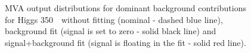 \begin{figure}[!hbtp]
\caption{
MVA output distributions for dominant background contributions for
Higgs 350~\GeV\ without fitting (nominal - dashed blue line),
background fit (signal is set to zero - solid black line) and
signal+background fit (signal is floating in the fit - solid red
line).}
\label{fig:bdt2_350}
\end{figure}

